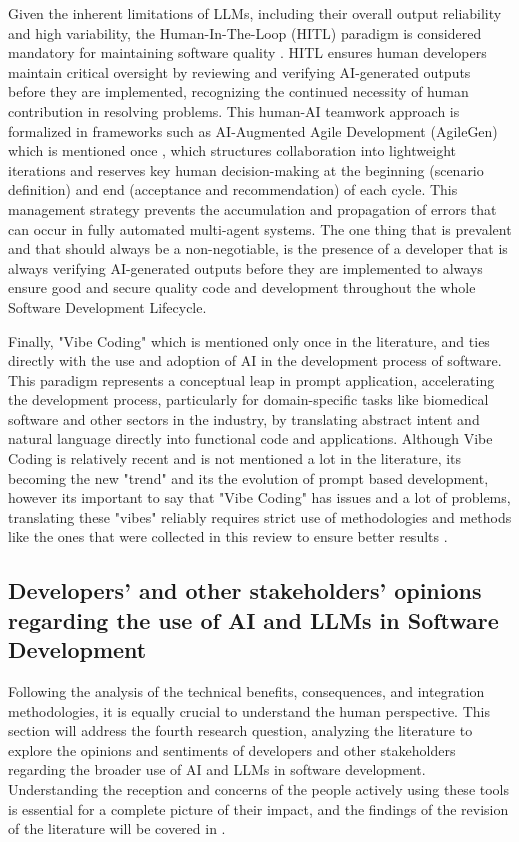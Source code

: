Given the inherent limitations of LLMs, including their overall output reliability and high variability, the Human-In-The-Loop (HITL) paradigm is considered mandatory for maintaining software quality \cite{Kim:2025ao}. HITL ensures human developers maintain critical oversight by reviewing and verifying AI-generated outputs before they are implemented, recognizing the continued necessity of human contribution in resolving problems. This human-AI teamwork approach is formalized in frameworks such as AI-Augmented Agile Development (AgileGen) which is mentioned once \cite{Zhang:2025ea}, which structures collaboration into lightweight iterations and reserves key human decision-making at the beginning (scenario definition) and end (acceptance and recommendation) of each cycle. This management strategy prevents the accumulation and propagation of errors that can occur in fully automated multi-agent systems. The one thing that is prevalent and that should always be a non-negotiable, is the presence of a developer that is always verifying AI-generated outputs before they are implemented to always ensure good and secure quality code and development throughout the whole Software Development Lifecycle.

Finally, "Vibe Coding" which is mentioned only once in the literature, and ties directly with the use and adoption of AI in the development process of software. This paradigm represents a conceptual leap in prompt application, accelerating the development process, particularly for domain-specific tasks like biomedical software and other sectors in the industry, by translating abstract intent and natural language directly into functional code and applications. Although Vibe Coding is relatively recent and is not mentioned a lot in the literature, its becoming the new "trend" and its the evolution of prompt based development, however its important to say that "Vibe Coding" has issues and a lot of problems, translating these "vibes" reliably requires strict use of methodologies and methods like the ones that were collected in this review to ensure better results \cite{Moore:2025vc}. 


\subsection{Developers’ and other stakeholders’ opinions regarding the use of AI and LLMs in Software Development}

Following the analysis of the technical benefits, consequences, and integration methodologies, it is equally crucial to understand the human perspective. This section will address the fourth research question, analyzing the literature to explore the opinions and sentiments of developers and other stakeholders regarding the broader use of AI and LLMs in software development. Understanding the reception and concerns of the people actively using these tools is essential for a complete picture of their impact, and the findings of the revision of the literature will be covered in .


